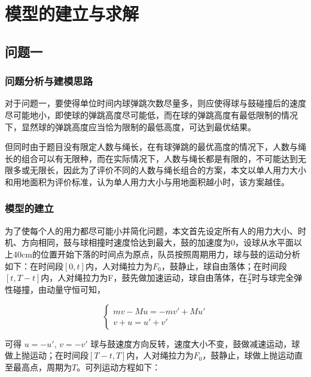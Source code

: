 \documentclass[withoutpreface,bwprint]{cumcmthesis} %
\begin{document}
\section{模型的建立与求解}

\subsection{问题一}
	\subsubsection{问题分析与建模思路}
对于问题一，要使得单位时间内球弹跳次数尽量多，则应使得球与鼓碰撞后的速度尽可能地小，即使球的弹跳高度尽可能低，而在球的弹跳高度有最低限制的情况下，显然球的弹跳高度应当恰为限制的最低高度，可达到最优结果。
\par
但同时由于题目没有限定人数与绳长，在有球弹跳的最优高度的情况下，人数与绳长的组合可以有无限种，而在实际情况下，人数与绳长都是有限的，不可能达到无限多或无限长，因此为了评价不同的人数与绳长组合的方案，本文以单人用力大小和用地面积为评价标准，认为单人用力大小与用地面积越小时，该方案越佳。

	\subsubsection{模型的建立}
为了使每个人的用力都尽可能小并简化问题，本文首先设定所有人的用力大小、时机、方向相同，鼓与球相撞时速度恰达到最大，鼓的加速度为0，设球从水平面以上40cm的位置开始下落的时间点为原点，队员按照周期用力，球与鼓的运动分析如下：在时间段$\left [ 0,t \right ]$内，人对绳拉力为$F_0$，鼓静止，球自由落体；在时间段$\left [ t,T-t \right ] $内，人对绳拉力为F，鼓先做加速运动，球自由落体，在$\frac{T}{2}$时与球完全弹性碰撞，由动量守恒可知，

\begin{equation}
\begin{cases}


mv-Mu=-m{v}'+M{u}'    \\
	v+u={u}'+{v}' 

\end{cases}
\end{equation}


可得 $u=-{u}'$, $v=-{v}'$ 球与鼓速度方向反转，速度大小不变，鼓做减速运动，球做上抛运动；在时间段$ \left [ T-t,T \right ]$内，人对绳拉力为$F_0$，鼓静止，球做上抛运动直至最高点，周期为$T$。可列运动方程如下：
\end{document}
